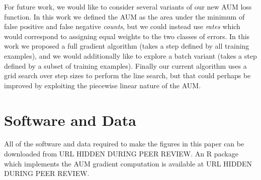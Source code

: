 \documentclass{article}
\begin{document}

For future work, we would like to consider several variants of our new AUM loss function.
In this work we defined the AUM as the area under the minimum of false positive and false negative \emph{counts}, but we could instead use \emph{rates} which would correspond to assigning equal weights to the two classes of errors.
In this work we proposed a full gradient algorithm (takes a step defined by all training examples), and we would additionally like to explore a batch variant (takes a step defined by a subset of training examples).
Finally our current algorithm uses a grid search over step sizes to perform the line search, but that could perhaps be improved by exploiting the piecewise linear nature of the AUM.

\section*{Software and Data}

All of the software and data required to make the figures in this paper can be downloaded from URL HIDDEN DURING PEER REVIEW. An R package which implements the AUM gradient computation is available at URL HIDDEN DURING PEER REVIEW.







\end{document}
